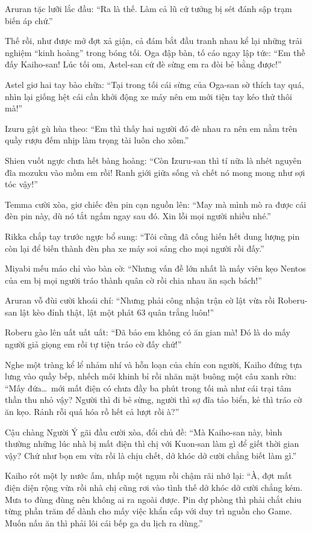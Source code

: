 \documentclass[../main.tex]{subfiles}
\begin{document}
Aruran tặc lưỡi lắc đầu: ``Ra là thế. Làm cả lũ cứ tưởng bị sét đánh sập trạm biến áp chứ.''

Thế rồi, như được mở đợt xả giận, cả đám bắt đầu tranh nhau kể lại những trải nghiệm ``kinh hoàng'' trong bóng tối. Oga đập bàn, tố cáo ngay lập tức: ``Em thề đấy Kaiho-san! Lúc tối om, Astel-san cứ đè sừng em ra đòi bẻ bằng được!''

Astel giơ hai tay bào chữa: ``Tại trong tối cái sừng của Oga-san sờ thích tay quá, nhìn lại giống hệt cái cần khởi động xe máy nên em mới tiện tay kéo thử thôi mà!''

Izuru gật gù hùa theo: ``Em thì thấy hai người đó đè nhau ra nên em nằm trên quầy rượu đếm nhịp làm trọng tài luôn cho xôm.''

Shien vuốt ngực chưa hết bàng hoàng: ``Còn Izuru-san thì tí nữa là nhét nguyên đĩa mozuku vào mồm em rồi! Ranh giới giữa sống và chết nó mong mong như sợi tóc vậy!''

Temma cười xòa, giơ chiếc đèn pin cạn nguồn lên: ``May mà mình mò ra được cái đèn pin này, dù nó tắt ngấm ngay sau đó. Xin lỗi mọi người nhiều nhé.''

Rikka chắp tay trước ngực bổ sung: ``Tôi cũng đã cống hiến hết dung lượng pin còn lại để biến thành đèn pha xe máy soi sáng cho mọi người rồi đấy.''

Miyabi mếu máo chỉ vào bàn cờ: ``Nhưng vấn đề lớn nhất là mấy viên kẹo Nentos của em bị mọi người tráo thành quân cờ rồi chia nhau ăn sạch bách!''

Aruran vỗ đùi cười khoái chí: ``Nhưng phải công nhận trận cờ lật vừa rồi Roberu-san lật kèo đỉnh thật, lật một phát 63 quân trắng luôn!''

Roberu gào lên uất uất uất: ``Đã bảo em không có ăn gian mà! Đó là do mấy người giả giọng em rồi tự tiện tráo cờ đấy chứ!''

Nghe một tràng kể lể nhảm nhí và hỗn loạn của chín con người, Kaiho đứng tựa lưng vào quầy bếp, nhếch môi khinh bỉ rồi nhăn mặt buông một câu xanh rờn: ``Mấy đứa\dots\ mới mất điện có chưa đầy ba phút trong tối mà như cái trại tâm thần thu nhỏ vậy? Người thì đi bẻ sừng, người thì sợ đĩa tảo biển, kẻ thì tráo cờ ăn kẹo. Rảnh rỗi quá hóa rồ hết cả lượt rồi à?''

Cậu chàng Người Ý gãi đầu cười xòa, đổi chủ đề: ``Mà Kaiho-san này, bình thường những lúc nhà bị mất điện thì chị với Kuon-san làm gì để giết thời gian vậy? Chứ như bọn em vừa rồi là chịu chết, dở khóc dở cười chẳng biết làm gì.''

Kaiho rót một ly nước ấm, nhấp một ngụm rồi chậm rãi nhớ lại: ``À, đợt mất điện diện rộng vừa rồi nhà chị cũng rơi vào tình thế dở khóc dở cười chẳng kém. Mưa to đùng đùng nên không ai ra ngoài được. Pin dự phòng thì phải chắt chiu từng phần trăm để dành cho mấy việc khẩn cấp với duy trì nguồn cho Game. Muốn nấu ăn thì phải lôi cái bếp ga du lịch ra dùng.''
\end{document}
